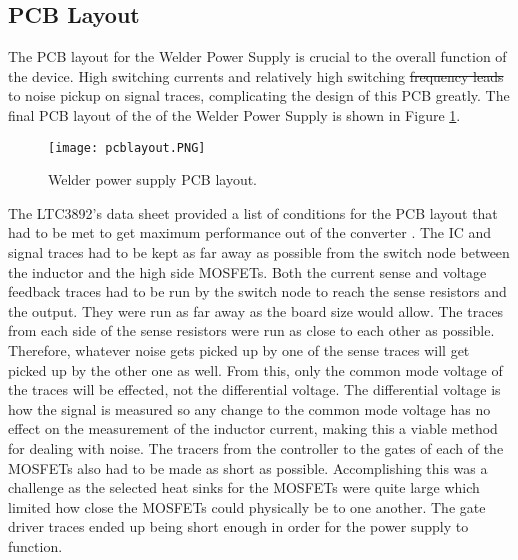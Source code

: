 \documentclass[11pt]{article}
\providecommand{\DIFadd}[1]{{\protect\color{blue}\uwave{#1}}} %
\providecommand{\DIFdel}[1]{{\protect\color{red}\sout{#1}}}                      %
\providecommand{\DIFaddbegin}{} %
\providecommand{\DIFaddend}{} %
\providecommand{\DIFdelbegin}{} %
\providecommand{\DIFdelend}{} %
\newcommand{\DIFscaledelfig}{0.5}
\newlength{\DIFdelgraphicswidth} %
\newlength{\DIFdelgraphicsheight} %
\newcommand{\DIFaddincludegraphics}[2][]{{\color{blue}\fbox{\DIFOincludegraphics[#1]{#2}}}} %
\newcommand{\DIFdelincludegraphics}[2][]{%
\sbox{\DIFdelgraphicsbox}{\DIFOincludegraphics[#1]{#2}}%
\settoboxwidth{\DIFdelgraphicswidth}{\DIFdelgraphicsbox} %
\settoboxtotalheight{\DIFdelgraphicsheight}{\DIFdelgraphicsbox} %
\scalebox{\DIFscaledelfig}{%
\parbox[b]{\DIFdelgraphicswidth}{\usebox{\DIFdelgraphicsbox}\\[-\baselineskip] \rule{\DIFdelgraphicswidth}{0em}}\llap{\resizebox{\DIFdelgraphicswidth}{\DIFdelgraphicsheight}{%
\setlength{\unitlength}{\DIFdelgraphicswidth}%
\begin{picture}(1,1)%
\thicklines\linethickness{2pt} %
{\color[rgb]{1,0,0}\put(0,0){\framebox(1,1){}}}%
{\color[rgb]{1,0,0}\put(0,0){\line( 1,1){1}}}%
{\color[rgb]{1,0,0}\put(0,1){\line(1,-1){1}}}%
\end{picture}%
}\hspace*{3pt}}} %
} %
\DeclareRobustCommand{\DIFaddbegin}{\DIFOaddbegin \let\includegraphics\DIFaddincludegraphics} %
\DeclareRobustCommand{\DIFaddend}{\DIFOaddend \let\includegraphics\DIFOincludegraphics} %
\DeclareRobustCommand{\DIFdelbegin}{\DIFOdelbegin \let\includegraphics\DIFdelincludegraphics} %
\DeclareRobustCommand{\DIFdelend}{\DIFOaddend \let\includegraphics\DIFOincludegraphics} %
\begin{document}
    \subsection{PCB Layout}

    \noindent The PCB layout for the Welder Power Supply is crucial to the overall function of the device. High switching currents and relatively high switching \DIFdelbegin \DIFdel{frequency leads }\DIFdelend \DIFaddbegin \DIFadd{frequencies lead }\DIFaddend to noise pickup on signal traces, complicating the design of this PCB greatly. The final PCB layout of the of the Welder Power Supply is shown in Figure \ref{pcb}.

    \begin{figure}[H]
        \centering
        \texttt{[image: pcblayout.PNG]}
        \caption{Welder power supply PCB layout.}
        \label{pcb}
    \end{figure}

    \noindent The LTC3892's data sheet provided a list of conditions for the PCB layout that had to be met to get maximum performance out of the converter \cite{linear_technology_ltc3892:_nodate}. The IC and signal traces had to be kept as far away as possible from the switch node between the inductor and the high side MOSFETs. Both the current sense and voltage feedback traces had to be run by the switch node to reach the sense resistors and the output. They were run as far away as the board size would allow. The traces from each side of the sense resistors were run as close to each other as possible. Therefore, whatever noise gets picked up by one of the sense traces will get picked up by the other one as well. From this, only the common mode voltage of the traces will be effected, not the differential voltage. The differential voltage is how the signal is measured so any change to the common mode voltage has no effect on the measurement of the inductor current, making this a viable method for dealing with noise.  
    \newline
    \newline
    \noindent The tracers from the controller to the gates of each of the MOSFETs also had to be made as short as possible. Accomplishing this was a challenge as the selected heat sinks for the MOSFETs were quite large which limited how close the MOSFETs could physically be to one another. The gate driver traces ended up being short enough in order for the power supply to function.
\end{document}
